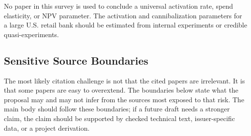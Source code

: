 \documentclass[11pt]{article}
\newcommand{\1}{\mathbf{1}}
\begin{document}
No paper in this survey is used to conclude a universal activation rate, spend
elasticity, or NPV parameter. The activation and cannibalization parameters for
a large U.S. retail bank should be estimated from internal experiments or
credible quasi-experiments.

\subsection*{Sensitive Source Boundaries}

The most likely citation challenge is not that the cited papers are irrelevant.
It is that some papers are easy to overextend. The boundaries below state what
the proposal may and may not infer from the sources most exposed to that risk.
The main body should follow these boundaries; if a future draft needs a
stronger claim, the claim should be supported by checked technical text,
issuer-specific data, or a project derivation.
\end{document}
